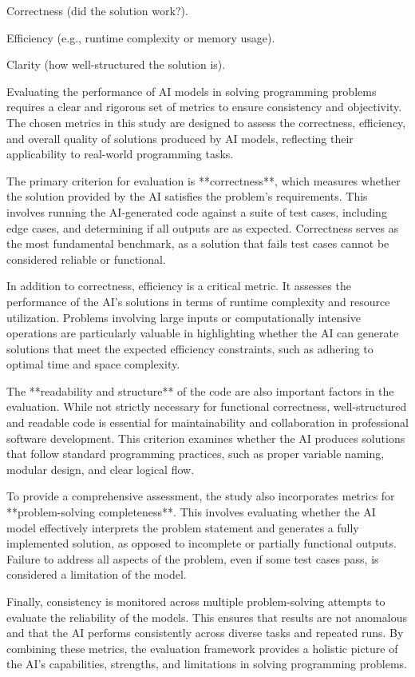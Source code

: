     Correctness (did the solution work?).

    Efficiency (e.g., runtime complexity or memory usage).

    Clarity (how well-structured the solution is).



Evaluating the performance of AI models in solving programming problems requires a clear and rigorous set of metrics to ensure consistency and objectivity. The chosen metrics in this study are designed to assess the correctness, efficiency, and overall quality of solutions produced by AI models, reflecting their applicability to real-world programming tasks.
    
The primary criterion for evaluation is **correctness**, which measures whether the solution provided by the AI satisfies the problem’s requirements. This involves running the AI-generated code against a suite of test cases, including edge cases, and determining if all outputs are as expected. Correctness serves as the most fundamental benchmark, as a solution that fails test cases cannot be considered reliable or functional.
    
In addition to correctness, efficiency is a critical metric. It assesses the performance of the AI’s solutions in terms of runtime complexity and resource utilization. Problems involving large inputs or computationally intensive operations are particularly valuable in highlighting whether the AI can generate solutions that meet the expected efficiency constraints, such as adhering to optimal time and space complexity.
    
The **readability and structure** of the code are also important factors in the evaluation. While not strictly necessary for functional correctness, well-structured and readable code is essential for maintainability and collaboration in professional software development. This criterion examines whether the AI produces solutions that follow standard programming practices, such as proper variable naming, modular design, and clear logical flow.
    
To provide a comprehensive assessment, the study also incorporates metrics for **problem-solving completeness**. This involves evaluating whether the AI model effectively interprets the problem statement and generates a fully implemented solution, as opposed to incomplete or partially functional outputs. Failure to address all aspects of the problem, even if some test cases pass, is considered a limitation of the model.
    
Finally, consistency is monitored across multiple problem-solving attempts to evaluate the reliability of the models. This ensures that results are not anomalous and that the AI performs consistently across diverse tasks and repeated runs. By combining these metrics, the evaluation framework provides a holistic picture of the AI’s capabilities, strengths, and limitations in solving programming problems.
